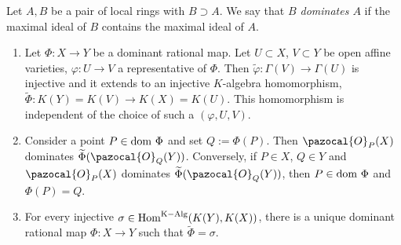     \begin{definition}
        Let $A,B$ be a pair of local rings with $B\supset A$. We say that \textit{$B$ dominates $A$} if the maximal ideal of $B$ contains the maximal ideal of $A$.
    \end{definition}
    \begin{proposition}\label{InducedMapFromDominantRationalMaps}
        \begin{enumerate}
            \item Let $\Phi:X\rightarrow Y$ be a dominant rational map. Let $U\subset X$, $V\subset Y$ be open affine varieties, $\varphi: U \rightarrow V$ a representative of $\Phi$. Then $\widetilde{\varphi}: \Gamma(V)\rightarrow \Gamma(U)$ is injective and it extends to an injective $K$-algebra homomorphism, $\widetilde{\Phi}: K(Y)=K(V)\rightarrow K(X)=K(U)$. This homomorphism is independent of the choice of such a $(\varphi, U, V)$.
            \item Consider a point $P\in \dom \ \Phi$ and set $Q:=\Phi(P)$. Then $\pazocal{O}_P(X)$ dominates $\widetilde{\Phi}(\pazocal{O}_Q(Y))$. Conversely, if $P\in X$, $Q\in Y$ and $\pazocal{O}_P(X)$ dominates $\widetilde{\Phi}(\pazocal{O}_Q(Y))$, then $P \in \dom \ \Phi$ and $\Phi(P)=Q$.
            \item For every injective $\sigma \in \mathrm{Hom}^{\mathrm{K-Alg}}(K(Y),K(X))$, there is a unique dominant rational map $\Phi : X\rightarrow Y $ such that $\widetilde{\Phi}=\sigma$.
        \end{enumerate}
    \end{proposition}
